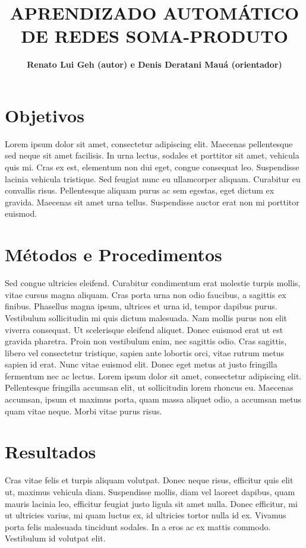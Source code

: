 \documentclass[10pt,a4paper]{article}
\title{APRENDIZADO AUTOMÁTICO DE REDES SOMA-PRODUTO}
\author{\textbf{Renato Lui Geh (autor) e Denis Deratani Mauá (orientador)}}
\affil{Instituto de Matemática e Estatística, Universidade de São Paulo}
\affil{\fontsize{10pt}{12}\selectfont\{renatolg,ddm\}@ime.usp.br}
\date{}
\begin{document}
\maketitle

\begin{multicols*}{2}

\section*{Objetivos}

Lorem ipsum dolor sit amet, consectetur adipiscing elit. Maecenas pellentesque
sed neque sit amet facilisis. In urna lectus, sodales et porttitor sit amet,
vehicula quis mi. Cras ex est, elementum non dui eget, congue consequat leo.
Suspendisse lacinia vehicula tristique. Sed feugiat nunc eu ullamcorper
aliquam. Curabitur eu convallis risus. Pellentesque aliquam purus ac sem
egestas, eget dictum ex gravida. Maecenas sit amet urna tellus. Suspendisse
auctor erat non mi porttitor euismod.

\section*{Métodos e Procedimentos}

Sed congue ultricies eleifend. Curabitur condimentum erat molestie turpis
mollis, vitae cursus magna aliquam. Cras porta urna non odio faucibus, a
sagittis ex finibus. Phasellus magna ipsum, ultrices et urna id, tempor dapibus
purus. Vestibulum sollicitudin mi quis dictum malesuada. Nam mollis purus non
elit viverra consequat. Ut scelerisque eleifend aliquet. Donec euismod erat ut
est gravida pharetra. Proin non vestibulum enim, nec sagittis odio. Cras
sagittis, libero vel consectetur tristique, sapien ante lobortis orci, vitae
rutrum metus sapien id erat. Nunc vitae euismod elit. Donec eget metus at justo
fringilla fermentum nec ac lectus. Lorem ipsum dolor sit amet, consectetur
adipiscing elit. Pellentesque fringilla accumsan elit, ut sollicitudin lorem
rhoncus eu. Maecenas accumsan, ipsum et maximus porta, quam massa aliquet odio,
a accumsan metus quam vitae neque. Morbi vitae purus risus.

\section*{Resultados}

Cras vitae felis et turpis aliquam volutpat. Donec neque risus, efficitur quis
elit ut, maximus vehicula diam. Suspendisse mollis, diam vel laoreet dapibus,
quam mauris lacinia leo, efficitur feugiat justo ligula sit amet nulla. Donec
efficitur, mi ut ultricies varius, mi quam luctus ex, id ultricies tortor nulla
id ex. Vivamus porta felis malesuada tincidunt sodales. In a eros ac ex mattis
commodo. Vestibulum id volutpat elit.


\end{multicols*}
\end{document}
